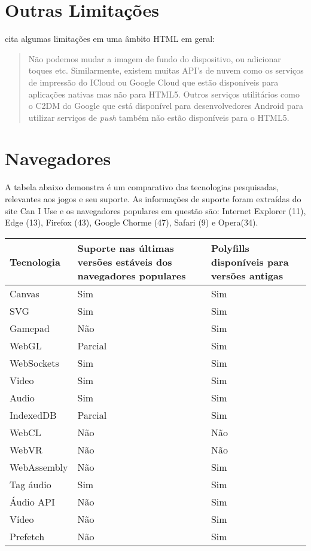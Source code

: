 \section{Outras Limitações}

\citet{html5Tradeoffs} cita algumas limitações em uma âmbito HTML em geral: 

\begin{quote} 
Não podemos mudar a imagem de fundo do dispositivo, ou adicionar toques
etc. Similarmente, existem muitas API's de nuvem como os serviços
de impressão do ICloud ou Google Cloud que estão disponíveis para
aplicações nativas mas não para HTML5. Outros serviços utilitários
como o C2DM do Google que está disponível para desenvolvedores Android
para utilizar serviços de \textit{push} também não estão disponíveis
para o HTML5.
\end{quote}

\section{Navegadores}

A tabela abaixo demonstra é um comparativo das tecnologias pesquisadas,
relevantes aos jogos e seu suporte. As informações de suporte foram
extraídas do site Can I Use e os navegadores populares em questão
são: Internet Explorer (11), Edge (13), Firefox (43), Google Chorme
(47), Safari (9) e Opera(34).

\begin{tabular}{ |p{3cm}|p{3cm}|p{3cm}|  }
\hline
Tecnologia & Suporte nas últimas versões estáveis dos navegadores populares & Polyfills disponíveis  para versões antigas \\
\hline
Canvas & Sim & Sim \\
SVG & Sim & Sim \\
Gamepad & Não & Sim \\
WebGL & Parcial & Sim \\
WebSockets & Sim & Sim \\
Video & Sim & Sim \\
Audio & Sim & Sim \\
IndexedDB & Parcial & Sim \\
WebCL & Não & Não \\
WebVR & Não & Não \\
WebAssembly & Não & Sim \\
Tag áudio & Sim & Sim \\
Áudio API & Não & Sim \\
Vídeo & Não & Sim \\
Prefetch & Não & Sim \\
\hline
\end{tabular}

